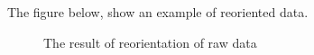 \documentclass{standalone}
\begin{document}
\noindent The figure below, show an example of reoriented data.
\begin{figure}[ht]
  \centering
  

 
  \caption{The result of reorientation of raw data}
  \label{fig:Accelerometer Reoriented}
\end{figure}
\end{document}
